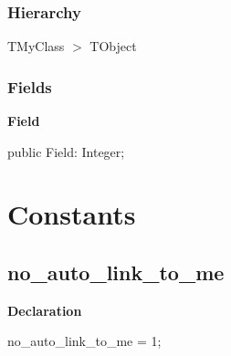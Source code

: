 \documentclass{report}
\newif\ifpdf
\begin{document}
\subsubsection*{\large{\textbf{Hierarchy}}\normalsize\hspace{1ex}\hfill}
TMyClass {$>$} TObject
\subsubsection*{\large{\textbf{Fields}}\normalsize\hspace{1ex}\hfill}
\begin{list}{}{
\setlength{\itemindent}{0cm}
\setlength{\listparindent}{0cm}
\setlength{\leftmargin}{\evensidemargin}
\addtolength{\leftmargin}{\tmplength}
\settowidth{\labelsep}{X}
\addtolength{\leftmargin}{\labelsep}
\setlength{\labelwidth}{\tmplength}
}
\label{ok_auto_link.TMyClass-Field}
\item[\textbf{Field}\hfill]
\ifpdf
\begin{flushleft}
\fi
\begin{ttfamily}
public Field: Integer;\end{ttfamily}

\ifpdf
\end{flushleft}
\fi


\par  \end{list}
\section{Constants}
\ifpdf
\subsection*{\large{\textbf{no{\_}auto{\_}link{\_}to{\_}me}}\normalsize\hspace{1ex}\hrulefill}
\else
\subsection*{no{\_}auto{\_}link{\_}to{\_}me}
\fi
\label{ok_auto_link-no_auto_link_to_me}
\begin{list}{}{
\setlength{\itemindent}{0cm}
\setlength{\listparindent}{0cm}
\setlength{\leftmargin}{\evensidemargin}
\addtolength{\leftmargin}{\tmplength}
\settowidth{\labelsep}{X}
\addtolength{\leftmargin}{\labelsep}
\setlength{\labelwidth}{\tmplength}
}
\item[\textbf{Declaration}\hfill]
\ifpdf
\begin{flushleft}
\fi
\begin{ttfamily}
no{\_}auto{\_}link{\_}to{\_}me = 1;\end{ttfamily}

\ifpdf
\end{flushleft}
\fi

\end{list}
\end{document}

